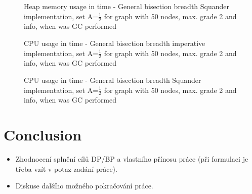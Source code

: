 \documentclass[11pt,twoside,a4paper]{book}
\begin{document}
\begin{figure}
\begin{center}

\caption{Heap memory usage in time - General bisection breadth Squander
implementation, set A=$\frac{1}{2}$ for graph with 50 nodes, max. grade 2 and
info, when was GC performed}
\label{fig:gbbSHeap50212}
\end{center}
\end{figure}



\begin{figure}
\begin{center}

\caption{CPU usage in time - General bisection breadth imperative
implementation, set A=$\frac{1}{2}$ for graph with 50 nodes, max. grade 2 and
info, when was GC performed}
\label{fig:gbbICpu50212}
\end{center}
\end{figure}

\begin{figure}
\begin{center}

\caption{CPU usage in time - General bisection breadth Squander
implementation, set A=$\frac{1}{2}$ for graph with 50 nodes, max. grade 2 and
info, when was GC performed}
\label{fig:gbbSCpu50212}
\end{center}
\end{figure}


\chapter{Conclusion}

\begin{itemize}
\item Zhodnocení splnění cílů DP/BP a  vlastního přínosu práce (při formulaci je třeba vzít v potaz zadání práce).
\item Diskuse dalšího možného pokračování práce.
\end{itemize} 

\end{document}
